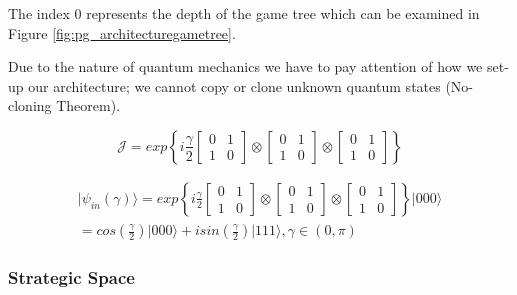 The index $0$ represents the depth of the game tree which can be examined in Figure \ref{fig:pg_architecturegametree}.

Due to the nature of quantum mechanics we have to pay attention of how we set-up our architecture; we cannot copy or clone unknown quantum states (No-cloning Theorem)\cite{Rieffel2011}. 



\begin{equation}
\mathcal{J}=exp\left\{ i\frac{\gamma}{2}\left[\begin{array}{cc}
0 & 1\\
1 & 0
\end{array}\right]\otimes\left[\begin{array}{cc}
0 & 1\\
1 & 0
\end{array}\right]
\otimes\left[\begin{array}{cc}
0 & 1\\
1 & 0
\end{array}\right]
\right\}
\label{eq:matrix_exponencial_esoterica}
\end{equation} 

\begin{equation}
\begin{split}
\vert\psi_{in}(\gamma)\rangle=exp\left\{ i\frac{\gamma}{2}\left[\begin{array}{cc}
0 & 1\\
1 & 0
\end{array}\right]\otimes\left[\begin{array}{cc}
0 & 1\\
1 & 0
\end{array}\right]\otimes\left[\begin{array}{cc}
0 & 1\\
1 & 0
\end{array}\right]\right\} \vert000\rangle \\
=cos(\frac{\gamma}{2})\vert000\rangle+isin(\frac{\gamma}{2})\vert111\rangle,\gamma\in(0,\pi)
\end{split}
\label{eq:estado_inicial_pg}
\end{equation}



\subsubsection{Strategic Space}
\label{subsec:strategic_space}

